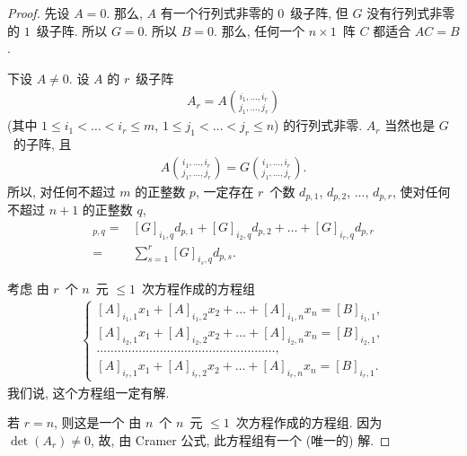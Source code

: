 \begin{proof}
    先设 \(A = 0\).
    那么, \(A\) 有一个行列式非零的 \(0\)~级子阵,
    但 \(G\) 没有行列式非零的 \(1\)~级子阵.
    所以 \(G = 0\).
    所以 \(B = 0\).
    那么, 任何一个 \(n \times 1\)~阵 \(C\)
    都适合 \(AC = B\).

    下设 \(A \neq 0\).
    设 \(A\) 的 \(r\)~级子阵
    \begin{align*}
        A_r = A\binom{i_1,\dots,i_r}{j_1,\dots,j_r}
    \end{align*}
    (其中
    \(1 \leq i_1 < \dots < i_r \leq m\),
    \(1 \leq j_1 < \dots < j_r \leq n\))
    的行列式非零.
    \(A_r\) 当然也是 \(G\)~的子阵, 且
    \begin{align*}
        A\binom{i_1,\dots,i_r}{j_1,\dots,j_r}
        =
        G\binom{i_1,\dots,i_r}{j_1,\dots,j_r}.
    \end{align*}
    所以, 对任何不超过 \(m\) 的正整数 \(p\),
    一定存在 \(r\)~个数
    \(d_{p,1}\), \(d_{p,2}\), \(\dots\), \(d_{p,r}\),
    使对任何不超过 \(n+1\) 的正整数 \(q\),
    \begin{align*}
        [G]_{p,q}
        = {} &
        [G]_{i_1,q} d_{p,1}
        + [G]_{i_2,q} d_{p,2}
        + \dots
        + [G]_{i_r,q} d_{p,r}
        \\
        = {} &
        \sum_{s = 1}^{r} {[G]_{i_s,q} d_{p,s}}.
    \end{align*}

    考虑%
    由 \(r\)~个 \(n\)~元 \({\leq} 1\)~次方程作成的方程组
    \begin{align*}
        \begin{cases}
            [A]_{i_1,1} x_1 + [A]_{i_1,2} x_2 + \dots
            + [A]_{i_1,n} x_n = [B]_{i_1,1},
            \\
            [A]_{i_2,1} x_1 + [A]_{i_2,2} x_2 + \dots
            + [A]_{i_2,n} x_n = [B]_{i_2,1},
            \\
            \dots
            \dots \dots \dots \dots
            \dots \dots \dots \dots
            \dots \dots \dots \dots
            \dots \dots \dots \dots,
            \\
            [A]_{i_r,1} x_1 + [A]_{i_r,2} x_2 + \dots
            + [A]_{i_r,n} x_n = [B]_{i_r,1}.
        \end{cases}
    \end{align*}
    我们说, 这个方程组一定有解.

    若 \(r = n\), 则这是一个%
    由 \(n\)~个 \(n\)~元 \({\leq} 1\)~次方程作成的方程组.
    因为 \(\det {(A_r)} \neq 0\),
    故, 由 Cramer 公式,
    此方程组有一个 (唯一的) 解.


\end{proof}
